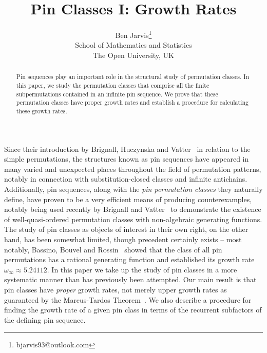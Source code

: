 \documentclass[11pt,a4paper]{article}
\title{Pin Classes I: Growth Rates}
\author{Ben Jarvis\footnote{bjarvis93@outlook.com}\\
\small School of Mathematics and Statistics\\
\small The Open University, UK
}
\theoremstyle{definition}
\begin{document}
\maketitle

\begin{abstract}
Pin sequences play an important role in the structural study of permutation classes. In this paper, we study the permutation classes that comprise all the finite subpermutations contained in an infinite pin sequence. We prove that these permutation classes have proper growth rates and establish a procedure for calculating these growth rates.
\end{abstract}

Since their introduction by Brignall, Huczynska and Vatter~\cite{brignall:decomposing-sim:} in relation to the simple permutations, the structures known as pin sequences have appeared in many varied and unexpected places throughout the field of permutation patterns, notably in connection with substitution-closed classes and infinite antichains. Additionally, pin sequences, along with the \emph{pin permutation classes} they naturally define, have proven to be a very efficient means of producing counterexamples, notably being used recently by Brignall and Vatter~\cite{bv:wqo-uncountable:} to demonstrate the existence of well-quasi-ordered permutation classes with non-algebraic generating functions. The study of pin classes as objects of interest in their own right, on the other hand, has been somewhat limited, though precedent certainly exists -- most notably, Bassino, Bouvel and Rossin~\cite{bassino:enumeration-of-:} showed that the class of all pin permutations has a rational generating function and established its growth rate $\omega_{\infty} \approx 5.24112$. In this paper we take up the study of pin classes in a more systematic manner than has previously been attempted. Our main result is that pin classes have \emph{proper} growth rates, not merely upper growth rates as guaranteed by the Marcus-Tardos Theorem~\cite{marcus:excluded-permut:}. We also describe a procedure for finding the growth rate of a given pin class in terms of the recurrent subfactors of the defining pin sequence. 
\end{document}
